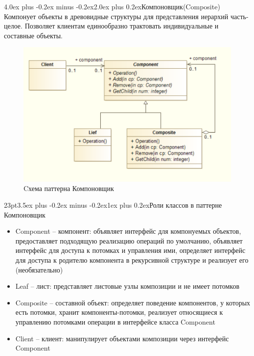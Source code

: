 \documentclass[12pt, a4paper]{book}%
\makeatletter
\renewcommand{\section}{\@startsection{section}{1}{1pt}%
{4.0ex plus -0.2ex minus -0.2ex}{2.0ex plus 0.2ex}{\centering\bf}}%
\renewcommand{\subsection}{\@startsection{subsection}{2}%
{23pt}{3.5ex plus -0.2ex minus -0.2ex}{1ex plus 0.2ex}{\bf}}%
\makeatother
\begin{document}
{\section{Компоновщик(Composite)}
Компонует объекты в древовидные структуры для представления иерархий
часть-целое. Позволяет клиентам единообразно трактовать индивидуальные
и составные объекты.
\begin{figure}[!ht]
\begin{center}
\includegraphics[scale=0.7]{images/pic/pic27-3.png}\caption{Cхема паттерна Компоновщик}\label{figure1}
\end{center}
\end{figure}
\subsection{Роли классов в паттерне Компоновщик}
\begin{itemize}
    \item Component – компонент: объявляет интерфейс для компонуемых объектов, предоставляет подходящую реализацию операций по умолчанию, объявляет интерфейс для доступа к потомках и управления ими, определяет интерфейс для доступа к родителю компонента в рекурсивной структуре и реализует его (необязательно)
    \item Leaf – лист: представляет листовые узлы композиции и не имеет потомков
    \item Composite – составной объект: определяет поведение компонентов, у которых есть потомки, хранит компоненты-потомки, реализует относящиеся к управлению потомками операции в интерфейсе класса Component
    \item Client – клиент: манипулирует объектами композиции через интерфейс Component
    \end{itemize}
}
\end{document}
